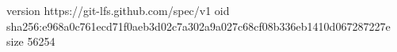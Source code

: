 version https://git-lfs.github.com/spec/v1
oid sha256:e968a0c761ecd71f0aeb3d02c7a302a9a027c68cf08b336eb1410d067287227e
size 56254
